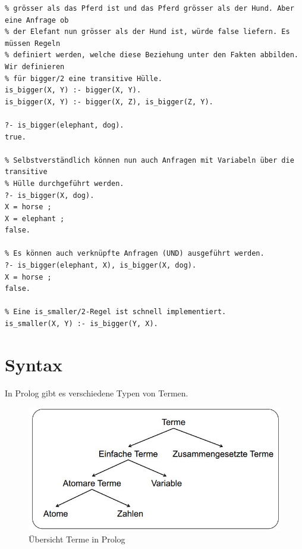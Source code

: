 \newpage

\begin{lstlisting}[caption=Transitive Hülle von \emph{bigger/2}]
% Wir wissen implizit, dass der Elefant grösser ist als der Hund. Da der Elefant
% grösser als das Pferd ist und das Pferd grösser als der Hund. Aber eine Anfrage ob 
% der Elefant nun grösser als der Hund ist, würde false liefern. Es müssen Regeln 
% definiert werden, welche diese Beziehung unter den Fakten abbilden. Wir definieren 
% für bigger/2 eine transitive Hülle.
is_bigger(X, Y) :- bigger(X, Y).
is_bigger(X, Y) :- bigger(X, Z), is_bigger(Z, Y).

?- is_bigger(elephant, dog).
true.

% Selbstverständlich können nun auch Anfragen mit Variabeln über die transitive 
% Hülle durchgeführt werden.
?- is_bigger(X, dog).
X = horse ;
X = elephant ;
false.

% Es können auch verknüpfte Anfragen (UND) ausgeführt werden.
?- is_bigger(elephant, X), is_bigger(X, dog).
X = horse ;
false.

% Eine is_smaller/2-Regel ist schnell implementiert.
is_smaller(X, Y) :- is_bigger(Y, X).
\end{lstlisting}

\section{Syntax}
In Prolog gibt es verschiedene Typen von Termen.

\begin{figure}[h!]
\centering
\includegraphics[width=0.5\linewidth]{fig/prolog-terme}
\caption{Übersicht Terme in Prolog}
\label{fig:prolog-terme}
\end{figure}

